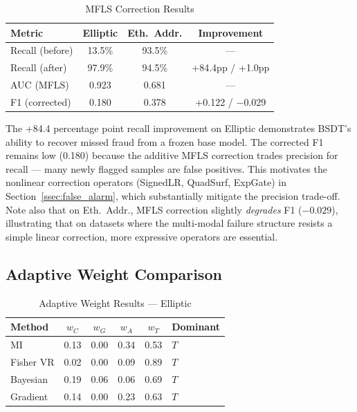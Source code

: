 \documentclass[journal]{IEEEtran}
\begin{document}
\begin{table}[!t]
\centering
\caption{MFLS Correction Results}
\label{tab:mfls_results}
\begin{tabular}{@{}lccc@{}}
\toprule
\textbf{Metric} & \textbf{Elliptic} & \textbf{Eth.\ Addr.} & \textbf{Improvement} \\
\midrule
Recall (before)  & 13.5\%  & 93.5\% & --- \\
Recall (after)   & 97.9\%  & 94.5\% & +84.4pp / +1.0pp \\
AUC (MFLS)       & 0.923   & 0.681  & --- \\
F1 (corrected)   & 0.180   & 0.378  & +0.122 / $-$0.029 \\
\bottomrule
\end{tabular}
\end{table}

The +84.4 percentage point recall improvement on Elliptic demonstrates BSDT's ability to recover missed fraud from a frozen base model. The corrected F1 remains low (0.180) because the additive MFLS correction trades precision for recall --- many newly flagged samples are false positives. This motivates the nonlinear correction operators (SignedLR, QuadSurf, ExpGate) in Section~\ref{ssec:false_alarm}, which substantially mitigate the precision trade-off.  Note also that on Eth.\ Addr., MFLS correction slightly \emph{degrades} F1 ($-0.029$), illustrating that on datasets where the multi-modal failure structure resists a simple linear correction, more expressive operators are essential.

\subsection{Adaptive Weight Comparison}
\label{ssec:weight_comparison}

\begin{table}[!t]
\centering
\caption{Adaptive Weight Results --- Elliptic}
\label{tab:weights_elliptic}
\begin{tabular}{@{}lccccl@{}}
\toprule
\textbf{Method} & $w_C$ & $w_G$ & $w_A$ & $w_T$ & \textbf{Dominant} \\
\midrule
MI        & 0.13 & 0.00 & 0.34 & 0.53 & $T$ \\
Fisher VR & 0.02 & 0.00 & 0.09 & 0.89 & $T$ \\
Bayesian  & 0.19 & 0.06 & 0.06 & 0.69 & $T$ \\
Gradient  & 0.14 & 0.00 & 0.23 & 0.63 & $T$ \\
\bottomrule
\end{tabular}
\end{table}
\end{document}
